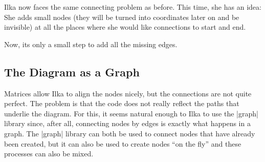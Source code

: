Ilka now faces the same connecting problem as before. This time, she
has an idea: She adds small nodes (they will be turned into
coordinates later on and be invisible) at all the places
where she would like connections to start and end.
\begin{codeexample}[]
\end{codeexample}
Now, its only a small step to add all the missing edges.



\subsection{The Diagram as a Graph}

Matrices allow Ilka to align the nodes nicely, but the connections are
not quite perfect. The problem is that the code does not really
reflect the paths that underlie the diagram. For this, it seems
natural enough to Ilka to use the |graph| library since, after all,
connecting nodes by edges is exactly what happens in a graph.
The |graph| library can both be used to connect nodes that have
already been created, but it can also be used to create nodes ``on the
fly'' and these processes can also be mixed.


